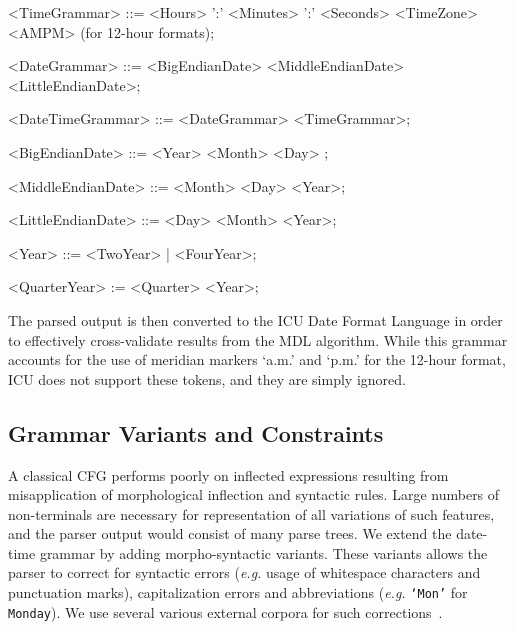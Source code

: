 \begin{grammar}
<TimeGrammar> ::= <Hours> ':' <Minutes> ':' <Seconds> <TimeZone> <AMPM> (for 12-hour formats);

<DateGrammar> ::= <BigEndianDate> 
				\alt <MiddleEndianDate> 
				\alt <LittleEndianDate>;

<DateTimeGrammar>  ::= <DateGrammar> 
					\alt <TimeGrammar>;
					

<BigEndianDate> ::= <Year> <Month>  <Day> ;

<MiddleEndianDate> ::= <Month> <Day> <Year>;

<LittleEndianDate> ::= <Day> <Month> <Year>;

<Year> ::= <TwoYear> | <FourYear>;

<QuarterYear> := <Quarter> <Year>;



%
%
%
%
%
%
%
%
%
%

\end{grammar}


The parsed output is then converted to the ICU Date Format Language in order to effectively cross-validate results from the MDL algorithm. While this grammar accounts for the use of meridian markers `a.m.' and `p.m.' for the 12-hour format, ICU does not support these tokens, and they are simply ignored.

\subsection{Grammar Variants and Constraints}

A classical CFG performs poorly on inflected expressions resulting from misapplication of morphological inflection and syntactic rules. Large numbers of non-terminals are necessary for representation of all variations of such features, and the parser output would consist of many parse trees. We extend the date-time grammar by adding morpho-syntactic variants. These variants allows the parser to correct for syntactic errors (\textit{e.g.} usage of whitespace characters and punctuation marks), capitalization errors and abbreviations (\textit{e.g.} \texttt{`Mon'} for \texttt{Monday}). We use several various external corpora for such corrections~\cite{nltkcorpora}.

